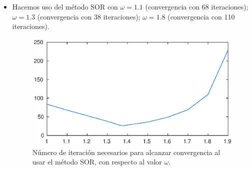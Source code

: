 \begin{itemize}
\item Hacemos uso del método SOR con $\omega=1.1$ (convergencia con 68 iteraciones);  $\omega=1.3$ (convergencia con 38 iteraciones);  $\omega=1.8$ (convergencia con 110 iteraciones).

\begin{figure}[h]
    \centering
    \includegraphics[scale=0.8]{Adicionales/iteraciones.eps} 
    \caption{Número de iteración necesarios para alcanzar convergencia al usar el método SOR, con respecto al valor $\omega$.}
    \label{test0}
\end{figure}




\end{itemize}
